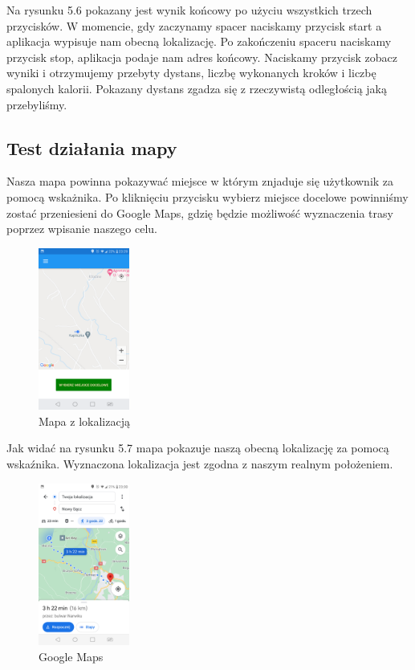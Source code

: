 Na rysunku 5.6 pokazany jest wynik końcowy po użyciu wszystkich trzech przycisków. W momencie, gdy zaczynamy spacer naciskamy przycisk start a aplikacja wypisuje nam obecną lokalizację. Po zakończeniu spaceru naciskamy przycisk stop, aplikacja podaje nam adres końcowy. Naciskamy przycisk zobacz wyniki i otrzymujemy przebyty dystans, liczbę wykonanych kroków i liczbę spalonych kalorii. Pokazany dystans zgadza się z rzeczywistą odległością jaką przebyliśmy.

\subsection{Test działania mapy}

Nasza mapa powinna pokazywać miejsce w którym znjaduje się użytkownik za pomocą wskażnika. Po kliknięciu przycisku wybierz miejsce docelowe powinniśmy zostać przeniesieni do Google Maps, gdzię będzie możliwość wyznaczenia trasy poprzez wpisanie naszego celu.

\begin{figure}[!htb]
	\begin{center}
		\includegraphics[width=3cm]{rys/ZZmapa.png}
		\caption{Mapa z lokalizacją}
		\label{rys:rysunek035}
	\end{center}
\end{figure} 

Jak widać na rysunku 5.7 mapa pokazuje naszą obecną lokalizację za pomocą wskaźnika. Wyznaczona lokalizacja jest zgodna z naszym realnym położeniem.

\begin{figure}[!htb]
	\begin{center}
		\includegraphics[width=3cm]{rys/ZZgm.png}
		\caption{Google Maps}
		\label{rys:rysunek036}
	\end{center}
\end{figure}

